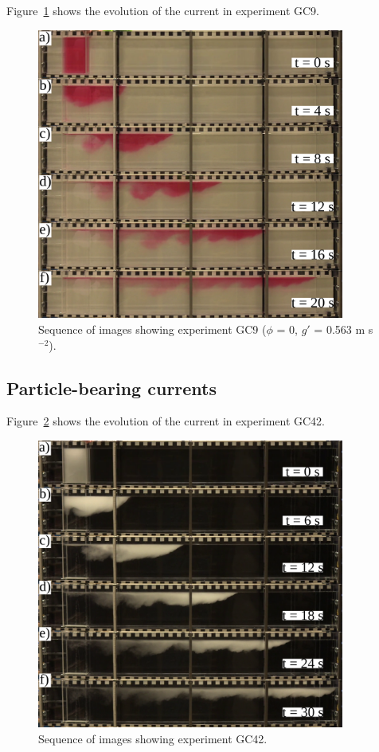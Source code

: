 \documentclass[authoryear,preprint,review,12pt]{elsarticle}
\begin{document}
Figure~\ref{fig:GC9} shows the evolution of the current in experiment GC9.

\begin{figure}[ht!]
  \centerline{\includegraphics[width=0.9\textwidth]{GC9.pdf}}
  \caption{Sequence of images showing experiment GC9 ($\phi$ = 0, $g\prime$ = 0.563 m s$^{-2}$). }
  \label{fig:GC9}
\end{figure}

\subsection{Particle-bearing currents}
\label{subsec:res_w_parts}

Figure~\ref{fig:GC42} shows the evolution of the current in experiment GC42.

\begin{figure}[ht!]
  \centerline{\includegraphics[width=0.9\textwidth]{GC42.pdf}}
  \caption{Sequence of images showing experiment GC42. }
  \label{fig:GC42}
\end{figure}
\end{document}
